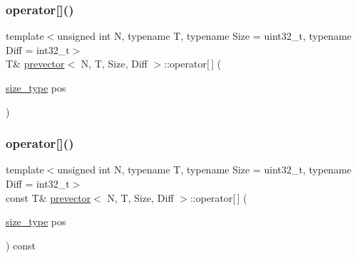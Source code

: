 \mbox{\label{classprevector_a06c929a30caa5842da7828e113030791}} 
\subsubsection{\texorpdfstring{operator[]()}{operator[]()}\hspace{0.1cm}{\footnotesize\ttfamily [1/2]}}
{\footnotesize\ttfamily template$<$unsigned int N, typename T, typename Size = uint32\+\_\+t, typename Diff = int32\+\_\+t$>$ \\
T\& \mbox{\hyperlink{classprevector}{prevector}}$<$ N, T, Size, Diff $>$\+::operator\mbox{[}$\,$\mbox{]} (\begin{DoxyParamCaption}\item[{\mbox{\hyperlink{classprevector_a7e0da95e6d1c878f6eeb572f4fc12524}{size\+\_\+type}}}]{pos }\end{DoxyParamCaption})\hspace{0.3cm}{\ttfamily [inline]}}

\mbox{\label{classprevector_a2aa1d5299104878a9e5441459927df72}} 
\subsubsection{\texorpdfstring{operator[]()}{operator[]()}\hspace{0.1cm}{\footnotesize\ttfamily [2/2]}}
{\footnotesize\ttfamily template$<$unsigned int N, typename T, typename Size = uint32\+\_\+t, typename Diff = int32\+\_\+t$>$ \\
const T\& \mbox{\hyperlink{classprevector}{prevector}}$<$ N, T, Size, Diff $>$\+::operator\mbox{[}$\,$\mbox{]} (\begin{DoxyParamCaption}\item[{\mbox{\hyperlink{classprevector_a7e0da95e6d1c878f6eeb572f4fc12524}{size\+\_\+type}}}]{pos }\end{DoxyParamCaption}) const\hspace{0.3cm}{\ttfamily [inline]}}

\mbox{\label{classprevector_a14e92ae67d4f110c66fe8c430f44a027}} 

